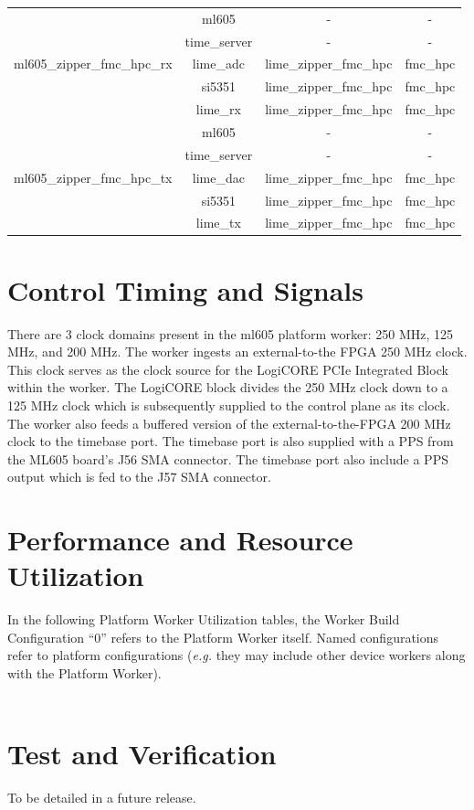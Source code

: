 \documentclass{article}
\edef\ecomp{ml605}
\begin{document}
\begin{tabular}{|c|c|c|c|}
		\hline
		\multirow{5}{*}{ml605\_zipper\_fmc\_hpc\_rx} &ml605 & - & - \\ &time\_server & - & - \\ &lime\_adc & lime\_zipper\_fmc\_hpc & fmc\_hpc \\  &si5351 & lime\_zipper\_fmc\_hpc & fmc\_hpc \\ &lime\_rx & lime\_zipper\_fmc\_hpc & fmc\_hpc \\
		\hline
		\multirow{5}{*}{ml605\_zipper\_fmc\_hpc\_tx} &ml605 & - & - \\ &time\_server & - & - \\ &lime\_dac & lime\_zipper\_fmc\_hpc & fmc\_hpc \\  &si5351 & lime\_zipper\_fmc\_hpc & fmc\_hpc \\ &lime\_tx & lime\_zipper\_fmc\_hpc & fmc\_hpc \\
		\hline
	\end{tabular}
	\section*{Control Timing and Signals}
	There are 3 clock domains present in the ml605 platform worker: 250 MHz, 125 MHz, and 200 MHz. The worker ingests an external-to-the FPGA 250 MHz clock. This clock serves as the clock source for the LogiCORE PCIe Integrated Block within the worker. The LogiCORE block divides the 250 MHz clock down to a 125 MHz clock which is subsequently supplied to the control plane as its clock. The worker also feeds a buffered version of the external-to-the-FPGA 200 MHz clock to the timebase port. The timebase port is also supplied with a PPS from the ML605 board's J56 SMA connector. The timebase port also include a PPS output which is fed to the J57 SMA connector.
\section*{Performance and Resource Utilization}
In the following Platform Worker Utilization tables, the Worker Build Configuration ``0'' refers to the Platform Worker itself. Named configurations refer to platform configurations (\textit{e.g.} they may include other device workers along with the Platform Worker).\\\\


\section*{Test and Verification}
\begin{flushleft}
 To be detailed in a future release.
\end{flushleft}
\end{document}
